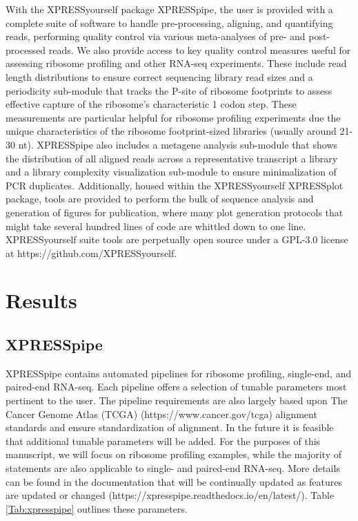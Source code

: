 \documentclass[11pt, a4paper, oneside]{article}
\begin{document}
With the XPRESSyourself package XPRESSpipe, the user is provided with a complete suite of software to handle pre-processing, aligning, and quantifying reads, performing quality control via various meta-analyses of pre- and post-processed reads. We also provide access to key quality control measures useful for assessing ribosome profiling and other RNA-seq experiments. These include read length distributions to ensure correct sequencing library read sizes and a periodicity sub-module that tracks the P-site of ribosome footprints to assess effective capture of the ribosome's characteristic 1 codon step. These measurements are particular helpful for ribosome profiling experiments due the unique characteristics of the ribosome footprint-sized libraries (usually around 21-30 nt). XPRESSpipe also includes a metagene analysis sub-module that shows the distribution of all aligned reads across a representative transcript a library and a library complexity visualization sub-module to ensure minimalization of PCR duplicates. Additionally, housed within the XPRESSyourself XPRESSplot package, tools are provided to perform the bulk of sequence analysis and generation of figures for publication, where many plot generation protocols that might take several hundred lines of code are whittled down to one line. XPRESSyourself suite tools are perpetually open source under a GPL-3.0 license at https://github.com/XPRESSyourself.


\section{Results}

\subsection{XPRESSpipe}
XPRESSpipe contains automated pipelines for ribosome profiling, single-end, and paired-end RNA-seq. Each pipeline offers a selection of tunable parameters most pertinent to the user. The pipeline requirements are also largely based upon The Cancer Genome Atlas (TCGA) (https://www.cancer.gov/tcga) alignment standards and ensure standardization of alignment. In the future it is feasible that additional tunable parameters will be added. For the purposes of this manuscript, we will focus on ribosome profiling examples, while the majority of statements are also applicable to single- and paired-end RNA-seq. More details can be found in the documentation that will be continually updated as features are updated or changed (https://xpresspipe.readthedocs.io/en/latest/). Table \ref{Tab:xpresspipe} outlines these parameters.
\end{document}
